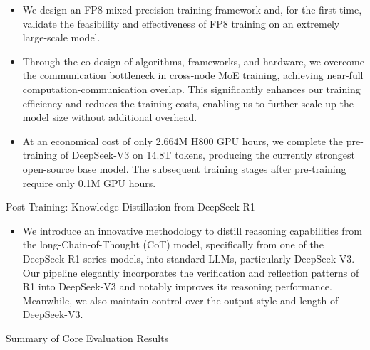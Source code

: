 \documentclass[11pt,a4paper]{article}
\begin{document}
\begin{itemize}
\item We design an FP8 mixed precision training framework and, for the first time, validate the feasibility and effectiveness of FP8 training on an extremely large-scale model.
\item Through the co-design of algorithms, frameworks, and hardware, we overcome the communication bottleneck in cross-node MoE training, achieving near-full computation-communication overlap. This significantly enhances our training efficiency and reduces the training costs, enabling us to further scale up the model size without additional overhead.
\item At an economical cost of only 2.664M H800 GPU hours, we complete the pre-training of DeepSeek-V3 on 14.8T tokens, producing the currently strongest open-source base model. The subsequent training stages after pre-training require only 0.1M GPU hours.
\end{itemize}

Post-Training: Knowledge Distillation from DeepSeek-R1

\begin{itemize}
\item We introduce an innovative methodology to distill reasoning capabilities from the long-Chain-of-Thought (CoT) model, specifically from one of the DeepSeek R1 series models, into standard LLMs, particularly DeepSeek-V3. Our pipeline elegantly incorporates the verification and reflection patterns of R1 into DeepSeek-V3 and notably improves its reasoning performance. Meanwhile, we also maintain control over the output style and length of DeepSeek-V3.
\end{itemize}

Summary of Core Evaluation Results
\end{document}

